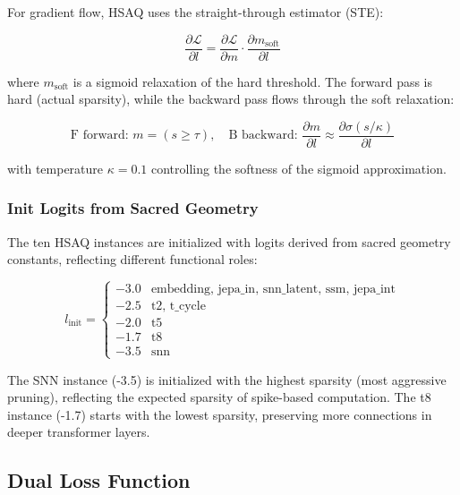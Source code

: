 \documentclass[conference]{IEEEtran}
\begin{document}
For gradient flow, HSAQ uses the straight-through estimator (STE):

\begin{equation}
\frac{\partial \mathcal{L}}{\partial l} = \frac{\partial \mathcal{L}}{\partial m} \cdot \frac{\partial m_{\text{soft}}}{\partial l}
\end{equation}

where $m_{\text{soft}}$ is a sigmoid relaxation of the hard threshold. The forward pass is hard (actual sparsity), while the backward pass flows through the soft relaxation:

\begin{equation}
\text{F forward: } m = (s \geq \tau), \quad
\text{B backward: } \frac{\partial m}{\partial l} \approx \frac{\partial \sigma(s / \kappa)}{\partial l}
\end{equation}

with temperature $\kappa = 0.1$ controlling the softness of the sigmoid approximation.

\subsubsection{Init Logits from Sacred Geometry}

The ten HSAQ instances are initialized with logits derived from sacred geometry constants, reflecting different functional roles:

\begin{equation}
l_{\text{init}} = \left\{
\begin{array}{ll}
-3.0 & \text{embedding, jepa\_in, snn\_latent, ssm, jepa\_int} \\
-2.5 & \text{t2, t\_cycle} \\
-2.0 & \text{t5} \\
-1.7 & \text{t8} \\
-3.5 & \text{snn}
\end{array}
\right.
\end{equation}

The SNN instance (-3.5) is initialized with the highest sparsity (most aggressive pruning), reflecting the expected sparsity of spike-based computation. The t8 instance (-1.7) starts with the lowest sparsity, preserving more connections in deeper transformer layers.

\subsection{Dual Loss Function}
\end{document}
